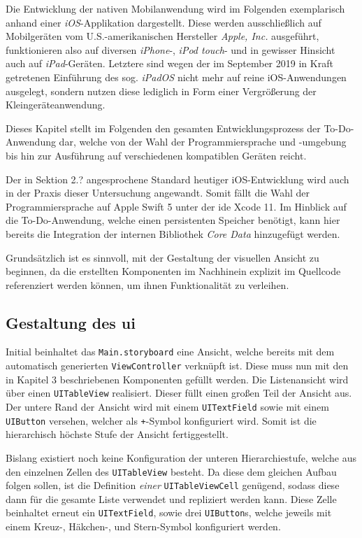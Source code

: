 Die Entwicklung der nativen Mobilanwendung wird im Folgenden exemplarisch anhand einer \textit{iOS}-Applikation dargestellt. Diese werden ausschließlich auf Mobilgeräten vom U.S.-amerikanischen Hersteller \textit{Apple, Inc.} ausgeführt, funktionieren also auf diversen \textit{iPhone}-, \textit{iPod touch}- und in gewisser Hinsicht auch auf \textit{iPad}-Geräten. Letztere sind wegen der im September 2019 in Kraft getretenen Einführung des sog. \textit{iPadOS} nicht mehr auf reine iOS-Anwendungen ausgelegt, sondern nutzen diese lediglich in Form einer Vergrößerung der Kleingeräteanwendung.

Dieses Kapitel stellt im Folgenden den gesamten Entwicklungsprozess der To-Do-Anwendung dar, welche von der Wahl der Programmiersprache und -umgebung bis hin zur Ausführung auf verschiedenen kompatiblen Geräten reicht.

Der in Sektion 2.? angesprochene Standard heutiger iOS-Entwicklung wird auch in der Praxis dieser Untersuchung angewandt. Somit fällt die Wahl der Programmiersprache auf Apple Swift 5 unter der \acs{ide} Xcode 11. Im Hinblick auf die To-Do-Anwendung, welche einen persistenten Speicher benötigt, kann hier bereits die Integration der internen Bibliothek \textit{Core Data} hinzugefügt werden.

Grundsätzlich ist es sinnvoll, mit der Gestaltung der visuellen Ansicht zu beginnen, da die erstellten Komponenten im Nachhinein explizit im Quellcode referenziert werden können, um ihnen Funktionalität zu verleihen.

\subsection{Gestaltung des \acl{ui}}
Initial beinhaltet das \texttt{Main.storyboard} eine Ansicht, welche bereits mit dem automatisch generierten \texttt{ViewController} verknüpft ist. Diese muss nun mit den in Kapitel 3 beschriebenen Komponenten gefüllt werden. Die Listenansicht wird über einen \texttt{UITableView} realisiert. Dieser füllt einen großen Teil der Ansicht aus. Der untere Rand der Ansicht wird mit einem \texttt{UITextField} sowie mit einem \texttt{UIButton} versehen, welcher als \texttt{+}-Symbol konfiguriert wird. Somit ist die hierarchisch höchste Stufe der Ansicht fertiggestellt.

Bislang existiert noch keine Konfiguration der unteren Hierarchiestufe, welche aus den einzelnen Zellen des \texttt{UITableView} besteht. Da diese dem gleichen Aufbau folgen sollen, ist die Definition \textit{einer} \texttt{UITableViewCell} genügend, sodass diese dann für die gesamte Liste verwendet und repliziert werden kann. Diese Zelle beinhaltet erneut ein \texttt{UITextField}, sowie drei \texttt{UIButton}s, welche jeweils mit einem Kreuz-, Häkchen-, und Stern-Symbol konfiguriert werden.

